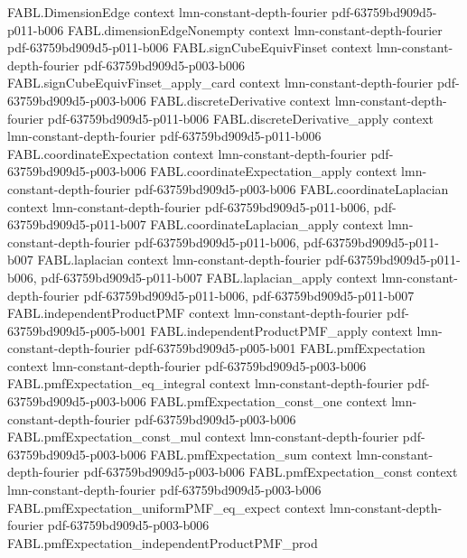 \begin{theorem}
\proofstep
  {FABL.DimensionEdge}
  {context}
  {lmn-constant-depth-fourier}
  {pdf-63759bd909d5-p011-b006}
\proofstep
  {FABL.dimensionEdgeNonempty}
  {context}
  {lmn-constant-depth-fourier}
  {pdf-63759bd909d5-p011-b006}
\proofstep
  {FABL.signCubeEquivFinset}
  {context}
  {lmn-constant-depth-fourier}
  {pdf-63759bd909d5-p003-b006}
\proofstep
  {FABL.signCubeEquivFinset_apply_card}
  {context}
  {lmn-constant-depth-fourier}
  {pdf-63759bd909d5-p003-b006}
\proofstep
  {FABL.discreteDerivative}
  {context}
  {lmn-constant-depth-fourier}
  {pdf-63759bd909d5-p011-b006}
\proofstep
  {FABL.discreteDerivative_apply}
  {context}
  {lmn-constant-depth-fourier}
  {pdf-63759bd909d5-p011-b006}
\proofstep
  {FABL.coordinateExpectation}
  {context}
  {lmn-constant-depth-fourier}
  {pdf-63759bd909d5-p003-b006}
\proofstep
  {FABL.coordinateExpectation_apply}
  {context}
  {lmn-constant-depth-fourier}
  {pdf-63759bd909d5-p003-b006}
\proofstep
  {FABL.coordinateLaplacian}
  {context}
  {lmn-constant-depth-fourier}
  {pdf-63759bd909d5-p011-b006,
    pdf-63759bd909d5-p011-b007}
\proofstep
  {FABL.coordinateLaplacian_apply}
  {context}
  {lmn-constant-depth-fourier}
  {pdf-63759bd909d5-p011-b006,
    pdf-63759bd909d5-p011-b007}
\proofstep
  {FABL.laplacian}
  {context}
  {lmn-constant-depth-fourier}
  {pdf-63759bd909d5-p011-b006,
    pdf-63759bd909d5-p011-b007}
\proofstep
  {FABL.laplacian_apply}
  {context}
  {lmn-constant-depth-fourier}
  {pdf-63759bd909d5-p011-b006,
    pdf-63759bd909d5-p011-b007}
\proofstep
  {FABL.independentProductPMF}
  {context}
  {lmn-constant-depth-fourier}
  {pdf-63759bd909d5-p005-b001}
\proofstep
  {FABL.independentProductPMF_apply}
  {context}
  {lmn-constant-depth-fourier}
  {pdf-63759bd909d5-p005-b001}
\proofstep
  {FABL.pmfExpectation}
  {context}
  {lmn-constant-depth-fourier}
  {pdf-63759bd909d5-p003-b006}
\proofstep
  {FABL.pmfExpectation_eq_integral}
  {context}
  {lmn-constant-depth-fourier}
  {pdf-63759bd909d5-p003-b006}
\proofstep
  {FABL.pmfExpectation_const_one}
  {context}
  {lmn-constant-depth-fourier}
  {pdf-63759bd909d5-p003-b006}
\proofstep
  {FABL.pmfExpectation_const_mul}
  {context}
  {lmn-constant-depth-fourier}
  {pdf-63759bd909d5-p003-b006}
\proofstep
  {FABL.pmfExpectation_sum}
  {context}
  {lmn-constant-depth-fourier}
  {pdf-63759bd909d5-p003-b006}
\proofstep
  {FABL.pmfExpectation_const}
  {context}
  {lmn-constant-depth-fourier}
  {pdf-63759bd909d5-p003-b006}
\proofstep
  {FABL.pmfExpectation_uniformPMF_eq_expect}
  {context}
  {lmn-constant-depth-fourier}
  {pdf-63759bd909d5-p003-b006}
\proofstep
  {FABL.pmfExpectation_independentProductPMF_prod}

\end{theorem}
